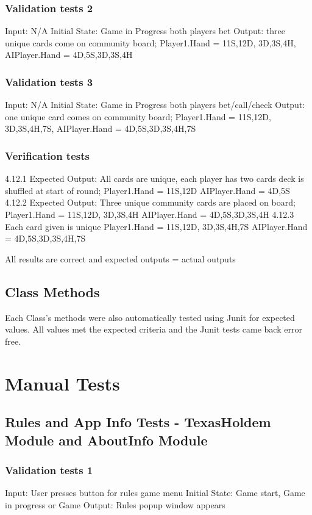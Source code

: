 \documentclass[11pt]{article}
\begin{document}
\subsubsection{Validation tests 2}
Input: N/A
Initial State: Game in Progress both players bet
Output: three unique cards come on community board; Player1.Hand = 11S,12D, 3D,3S,4H,
AIPlayer.Hand = 4D,5S,3D,3S,4H

\subsubsection{Validation tests 3}
Input: N/A
Initial State: Game in Progress both players bet/call/check 
Output: one unique card comes on community board; Player1.Hand = 11S,12D, 3D,3S,4H,7S,
AIPlayer.Hand = 4D,5S,3D,3S,4H,7S

\subsubsection{Verification tests}
4.12.1 Expected Output: All cards are unique, each player has two cards deck is shuffled at start of round; Player1.Hand = 11S,12D AIPlayer.Hand = 4D,5S
4.12.2 Expected Output: Three unique community cards are placed on board;
Player1.Hand = 11S,12D, 3D,3S,4H
AIPlayer.Hand = 4D,5S,3D,3S,4H
4.12.3 Each card given is unique
Player1.Hand = 11S,12D, 3D,3S,4H,7S
AIPlayer.Hand = 4D,5S,3D,3S,4H,7S

All results are correct and expected outputs = actual outputs

\subsection{Class Methods}

Each Class’s methods were also automatically tested using Junit for expected values. All values met the expected criteria and the Junit tests came back error free.

\section{Manual Tests}
\subsection{Rules and App Info Tests - TexasHoldem Module and AboutInfo Module}

\subsubsection{Validation tests 1}
Input: User presses button for rules game menu
Initial State: Game start, Game in progress or Game 
Output: Rules popup window appears
\end{document}
